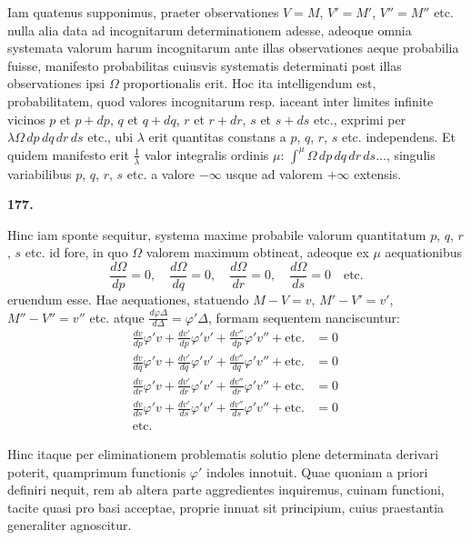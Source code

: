 \documentclass[11pt,a4paper]{article}
\begin{document}
Iam quatenus supponimus, praeter observationes $V=M$, $V'=M'$, $V''=M''$ etc. nulla alia data ad incognitarum determinationem adesse, adeoque omnia systemata valorum harum incognitarum ante illas observationes aeque probabilia fuisse, manifesto probabilitas cuiusvis systematis determinati post illas observationes ipsi $\Omega$ proportionalis erit. Hoc ita intelligendum est, probabilitatem, quod valores incognitarum resp. iaceant inter limites infinite vicinos $p$ et $p+dp$, $q$ et $q+dq$, $r$ et $r+dr$, $s$ et $s+ds$ etc., exprimi per $\lambda\Omega \, dp \, dq \, dr \, ds$ etc., ubi $\lambda$ erit quantitas constans a $p$, $q$, $r$, $s$ etc. independens. Et quidem manifesto erit $\frac{1}{\lambda}$ valor integralis ordinis $\mu$: $\int^\mu \Omega \, dp \, dq \, dr \, ds \ldots$, singulis variabilibus $p$, $q$, $r$, $s$ etc. a valore $-\infty$ usque ad valorem $+\infty$ extensis.

\vspace{1em}

\noindent\textbf{177.}

Hinc iam sponte sequitur, systema maxime probabile valorum quantitatum $p$, $q$, $r$, $s$ etc. id fore, in quo $\Omega$ valorem maximum obtineat, adeoque ex $\mu$ aequationibus
\[
\frac{d\Omega}{dp} = 0, \quad \frac{d\Omega}{dq} = 0, \quad \frac{d\Omega}{dr} = 0, \quad \frac{d\Omega}{ds} = 0 \quad \text{etc.}
\]
eruendum esse. Hae aequationes, statuendo $M-V = v$, $M'-V' = v'$, $M''-V'' = v''$ etc. atque $\frac{d\varphi\Delta}{d\Delta} = \varphi'\Delta$, formam sequentem nanciscuntur:
\begin{align*}
\frac{dv}{dp}\varphi'v + \frac{dv'}{dp}\varphi'v' + \frac{dv''}{dp}\varphi'v'' + \text{etc.} &= 0 \\
\frac{dv}{dq}\varphi'v + \frac{dv'}{dq}\varphi'v' + \frac{dv''}{dq}\varphi'v'' + \text{etc.} &= 0 \\
\frac{dv}{dr}\varphi'v + \frac{dv'}{dr}\varphi'v' + \frac{dv''}{dr}\varphi'v'' + \text{etc.} &= 0 \\
\frac{dv}{ds}\varphi'v + \frac{dv'}{ds}\varphi'v' + \frac{dv''}{ds}\varphi'v'' + \text{etc.} &= 0 \\
\text{etc.} &\qquad
\end{align*}

Hinc itaque per eliminationem problematis solutio plene determinata derivari poterit, quamprimum functionis $\varphi'$ indoles innotuit. Quae quoniam a priori definiri nequit, rem ab altera parte aggredientes inquiremus, cuinam functioni, tacite quasi pro basi acceptae, proprie innuat sit principium, cuius praestantia generaliter agnoscitur.
\end{document}
